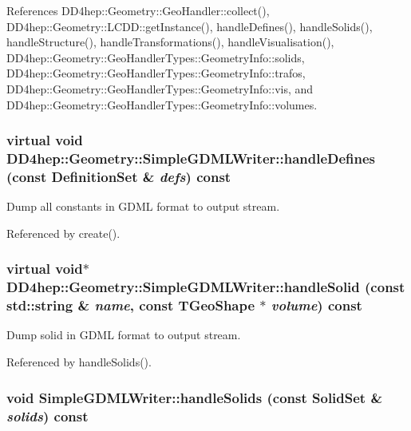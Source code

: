 References DD4hep::Geometry::GeoHandler::collect(), DD4hep::Geometry::LCDD::getInstance(), handleDefines(), handleSolids(), handleStructure(), handleTransformations(), handleVisualisation(), DD4hep::Geometry::GeoHandlerTypes::GeometryInfo::solids, DD4hep::Geometry::GeoHandlerTypes::GeometryInfo::trafos, DD4hep::Geometry::GeoHandlerTypes::GeometryInfo::vis, and DD4hep::Geometry::GeoHandlerTypes::GeometryInfo::volumes.\hypertarget{class_d_d4hep_1_1_geometry_1_1_simple_g_d_m_l_writer_ad1e62eccf785a9d3cd34806aa6bc2cac}{
\subsubsection[{handleDefines}]{\setlength{\rightskip}{0pt plus 5cm}virtual void DD4hep::Geometry::SimpleGDMLWriter::handleDefines (const {\bf DefinitionSet} \& {\em defs}) const}}
\label{class_d_d4hep_1_1_geometry_1_1_simple_g_d_m_l_writer_ad1e62eccf785a9d3cd34806aa6bc2cac}


Dump all constants in GDML format to output stream. 

Referenced by create().\hypertarget{class_d_d4hep_1_1_geometry_1_1_simple_g_d_m_l_writer_a77a44b4f0061288ba94126a2e2ef8cc0}{
\subsubsection[{handleSolid}]{\setlength{\rightskip}{0pt plus 5cm}virtual void$\ast$ DD4hep::Geometry::SimpleGDMLWriter::handleSolid (const std::string \& {\em name}, \/  const TGeoShape $\ast$ {\em volume}) const}}
\label{class_d_d4hep_1_1_geometry_1_1_simple_g_d_m_l_writer_a77a44b4f0061288ba94126a2e2ef8cc0}


Dump solid in GDML format to output stream. 

Referenced by handleSolids().\hypertarget{class_d_d4hep_1_1_geometry_1_1_simple_g_d_m_l_writer_a7f5910a2161e23d80f32e76df06de00a}{
\subsubsection[{handleSolids}]{\setlength{\rightskip}{0pt plus 5cm}void SimpleGDMLWriter::handleSolids (const {\bf SolidSet} \& {\em solids}) const}}
\label{class_d_d4hep_1_1_geometry_1_1_simple_g_d_m_l_writer_a7f5910a2161e23d80f32e76df06de00a}



